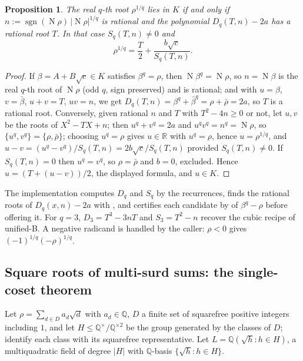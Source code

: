\documentclass[11pt,oneside]{article}
\numberwithin{equation}{section}
\newtheorem{proposition}[theorem]{Proposition}
\theoremstyle{definition}
\theoremstyle{remark}
\newcommand{\code}[1]{\texttt{\detokenize{#1}}}
\newcommand{\Q}{\mathbb{Q}}
\newcommand{\R}{\mathbb{R}}
\DeclareMathOperator{\sgn}{sgn}
\DeclareMathOperator{\Nm}{N}
\begin{document}
\begin{proposition}\label{prop:odd}
The real $q$-th root $\rho^{1/q}$ lies in $K$ if and only if $n:=\sgn(\Nm\rho)\,|\Nm\rho|^{1/q}$ is rational and the polynomial $D_q(T,n)-2a$ has a rational root $T$. In that case $S_q(T,n)\ne0$ and
\[\rho^{1/q}=\frac T2+\frac{b\sqrt c}{S_q(T,n)}.\]
\end{proposition}
\begin{proof}
If $\beta=A+B\sqrt c\in K$ satisfies $\beta^q=\rho$, then $\Nm\beta^q=\Nm\rho$, so $n=\Nm\beta$ is the real $q$-th root of $\Nm\rho$ (odd $q$, sign preserved) and is rational; and with $u=\beta$, $v=\bar\beta$, $u+v=T$, $uv=n$, we get $D_q(T,n)=\beta^q+\bar\beta^q=\rho+\bar\rho=2a$, so $T$ is a rational root. Conversely, given rational $n$ and $T$ with $T^2-4n\ge0$ or not, let $u,v$ be the roots of $X^2-TX+n$; then $u^q+v^q=2a$ and $u^qv^q=n^q=\Nm\rho$, so $\{u^q,v^q\}=\{\rho,\bar\rho\}$; choosing $u^q=\rho$ gives $u\in\R$ with $u^q=\rho$, hence $u=\rho^{1/q}$, and $u-v=(u^q-v^q)/S_q(T,n)=2b\sqrt c/S_q(T,n)$ provided $S_q(T,n)\ne0$. If $S_q(T,n)=0$ then $u^q=v^q$, so $\rho=\bar\rho$ and $b=0$, excluded. Hence $u=(T+(u-v))/2$, the displayed formula, and $u\in K$.
\end{proof}
The implementation computes $D_q$ and $S_q$ by the recurrences, finds the rational roots of $D_q(x,n)-2a$ with \code{rationalRoots}, and certifies each candidate by \code{RootReduce} of $\beta^q-\rho$ before offering it. For $q=3$, $D_3=T^3-3nT$ and $S_3=T^2-n$ recover the cubic recipe of unified-B. A negative radicand is handled by the caller: $\rho<0$ gives $(-1)^{1/q}(-\rho)^{1/q}$.

\subsection{Square roots of multi-surd sums: the single-coset theorem}\label{sec:math:coset}
Let $\rho=\sum_{d\in D}a_d\sqrt d$ with $a_d\in\Q$, $D$ a finite set of squarefree positive integers including $1$, and let $H\le\Q^\times/\Q^{\times2}$ be the group generated by the classes of $D$; identify each class with its squarefree representative. Let $L=\Q(\sqrt h:h\in H)$, a multiquadratic field of degree $|H|$ with $\Q$-basis $\{\sqrt h:h\in H\}$.
\end{document}
